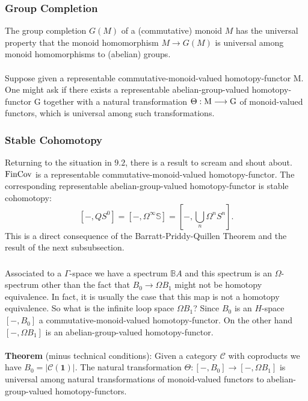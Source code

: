 \documentclass[11pt]{article}
\begin{document}
\begin{Jandr GammaCat notes}
\subsubsection{Group Completion}
The group completion $G(M)$ of a (commutative) monoid $M$ has the universal property that the monoid homomorphism $M\to G(M)$ is universal among monoid homomorphisms to (abelian) groups.\\
\\
Suppose given a representable commutative-monoid-valued homotopy-functor M. One might ask if there exists a representable abelian-group-valued homotopy-functor G together with a natural transformation $\Theta:\textup{M}\to\textup{G}$ of monoid-valued functors, which is universal among such transformations.
\subsubsection{Stable Cohomotopy}
Returning to the situation in $9.2$, there is a result to scream and shout about. $\textup{FinCov}$ is a representable commutative-monoid-valued homotopy-functor. The corresponding representable abelian-group-valued homotopy-functor is stable cohomotopy:
\[[-,QS^0]=[-,\Omega^{\infty}\mathbb{S}]=[-,\bigcup_{n}\Omega^n S^n].\]
This is a direct consequence of the Barratt-Priddy-Quillen Theorem and the result of the next subsubsection.
\subsubsection{}
Associated to a $\Gamma$-space we have a spectrum $\mathbb{B}A$ and this spectrum is an $\Omega$-spectrum other than the fact that $B_0\to\Omega B_1$ might not be homotopy equivalence. In fact, it is usually the case that this map is not a homotopy equivalence. So what is the infinite loop space $\Omega B_1$? Since $B_0$ is an $H$-space $[-,B_0]$ a commutative-monoid-valued homotopy-functor. On the other hand $[-,\Omega B_1]$ is an abelian-group-valued homotopy-functor.\\
\\
\textbf{Theorem} (minus technical conditions): Given a category $\mathscr{C}$ with coproducts we have $B_0=|\mathscr{C}(\textbf{1})|$. The natural transformation $\Theta: [-,B_0]\to [-,\Omega B_1]$ is universal among natural transformations of monoid-valued functors to abelian-group-valued homotopy-functors.


\pagebreak
\end{Jandr GammaCat notes}
\end{document}
